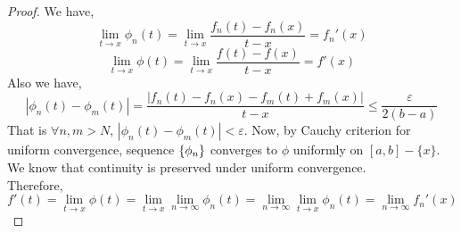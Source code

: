\begin{proof}
	We have,
	\[ \lim_{t \to x}\phi_n(t) = \lim_{t \to x} \frac{f_n(t) - f_n(x)}{t-x} = f_n'(x) \]
	\[ \lim_{t \to x} \phi(t) = \lim_{t \to x} \frac{f(t)-f(x)}{t-x} = f'(x) \]
	Also we have,
	\[ |\phi_n(t)-\phi_m(t)| = \frac{|f_n(t)-f_n(x)-f_m(t) + f_m(x)|}{t-x} \le \frac{\varepsilon}{2(b-a)} \]
	That is $\forall n,m > N$, $|\phi_n(t)-\phi_m(t)| < \varepsilon$.
	Now, by Cauchy criterion for uniform convergence, sequence $\left\{\phi_n\right\}$ converges to $\phi$ uniformly on $[a,b]-\{x\}$.\\

	We know that continuity is preserved under uniform convergence.\\
	Therefore,
	\[ f'(t) = \lim_{t \to x} \phi(t) = \lim_{t \to x} \lim_{n \to \infty} \phi_n(t) = \lim_{n \to \infty} \lim_{t \to x} \phi_n(t) = \lim_{n \to \infty} f_n'(x) \]

\end{proof}

